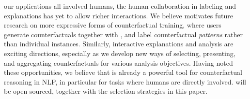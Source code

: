 our applications all involved humans, the human-\sysname collaboration in labeling and explanations has yet to allow richer interactions. 
We believe \sysname motivates future research on more expressive forms of counterfactual training, where users generate counterfactuals together with \sysname, and label counterfactual \emph{patterns} rather than individual instances. 
Similarly, interactive explanations and analysis are exciting directions, especially as we develop new ways of selecting, presenting, and aggregating counterfactuals for various analysis objectives.
Having noted these opportunities, we believe that \sysname is already a powerful tool for counterfactual reasoning in NLP, in particular for tasks where humans are directly involved. 
\sysname will be open-sourced, together with the selection strategies in this paper.




